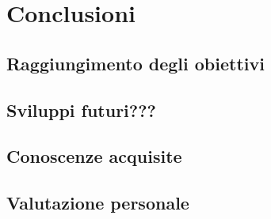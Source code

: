 \chapter{Conclusioni}
\label{cap:conclusioni}

\section{Raggiungimento degli obiettivi}

\section{Sviluppi futuri???}

\section{Conoscenze acquisite}

\section{Valutazione personale}
